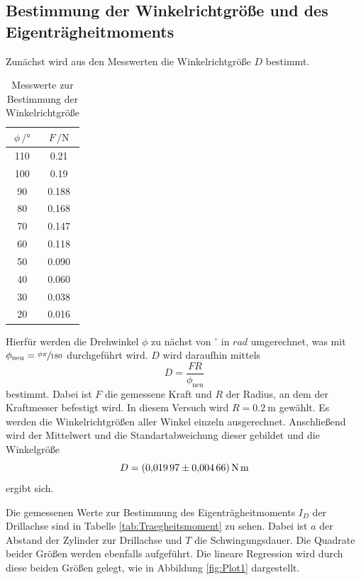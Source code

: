 \subsection{Bestimmung der Winkelrichtgröße und des Eigenträgheitmoments}
Zunächst wird aus den Messwerten die Winkelrichtgröße $D$ bestimmt.
\begin{table}[H]
  \centering
  \caption{Messwerte zur Bestimmung der Winkelrichtgröße}
  \label{tab:Winkelrichtgroesse}
  \begin{tabular}{
  c c
  }
    \toprule
     $\phi \, / \unit{°}$ & $F\, / \unit{\newton}$\\
    \midrule
    110 & 0.21 \\
    100 & 0.19 \\
    90  & 0.188\\
    80  & 0.168\\
    70  & 0.147\\
    60  & 0.118\\
    50  & 0.090\\
    40  & 0.060\\
    30  & 0.038\\
    20  & 0.016\\
    \bottomrule
  \end{tabular}
\end{table}
Hierfür werden die Drehwinkel $\phi$ zu nächst von $^\circ$ in $rad$ umgerechnet, 
was mit $\phi_\text{neu} = \sfrac{\phi \pi}{180}$ durchgeführt wird.
$D$ wird daraufhin mittels
\begin{equation}
  D = \frac{F R}{\phi_\text{neu}}
\end{equation}
bestimmt.
Dabei ist $F$ die gemessene Kraft und $R$ der Radius, an dem der Kraftmesser befestigt wird.
In diesem Versuch wird $R = \SI{0.2}{\meter}$ gewählt.
Es werden die Winkelrichtgrößen aller Winkel einzeln ausgerechnet.
Anschließend wird der Mittelwert und die Standartabweichung dieser gebildet und die Winkelgröße
\begin{equation*}
  D = \SI{0.01997 \pm 0.00466}{\N \meter}
\end{equation*}
ergibt sich.

Die gemessenen Werte zur Bestimmung des Eigenträgheitmoments $I_D$ der Drillachse sind in Tabelle \ref{tab:Traegheitsmoment} zu sehen.
Dabei ist $a$ der Abstand der Zylinder zur Drillachse und $T$ die Schwingungsdauer.
Die Quadrate beider Größen werden ebenfalls aufgeführt.
Die lineare Regression wird durch diese beiden Größen gelegt, wie in Abbildung \ref{fig:Plot1} dargestellt.


